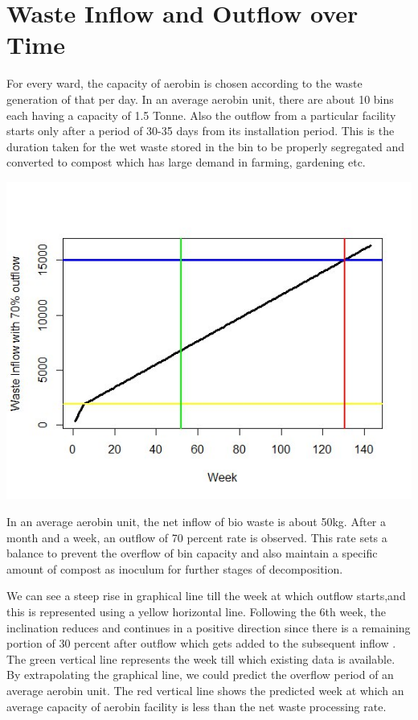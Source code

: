 \documentclass[12pt,a4paper]{  report}
\begin{document}
\section{Waste Inflow and Outflow over Time}
\begin{justify}
	For every ward, the capacity of aerobin is chosen according to the waste generation of that per day. In an average aerobin unit, there are about 10 bins each having a capacity of 1.5 Tonne. Also the outflow from a particular facility starts only after a period of 30-35 days from its installation period. This is the duration taken for the wet waste stored in the bin to be properly segregated and converted to compost which has large demand in farming, gardening etc.
	
	\includegraphics[width=1\textwidth]{wio}
	
	In an average aerobin unit, the net inflow of bio waste is about 50kg. After a month and a week, an outflow of 70 percent rate is observed. This rate sets a balance to prevent the overflow of bin capacity and also maintain a specific amount of compost as inoculum for further stages of decomposition. 
	
	We can see a steep rise in graphical line till the week at which outflow starts,and this is represented using a yellow horizontal line. Following the 6th week, the inclination reduces and continues in a  positive direction since there is a remaining portion of 30 percent after outflow which gets added to the subsequent inflow . The green vertical line represents the week till which existing data is available. By extrapolating the graphical line, we could predict the overflow period of an average aerobin unit. The red vertical line shows the predicted week at which an average capacity of aerobin facility is less than the net waste processing rate. 
	
\end{justify}
\end{document}

